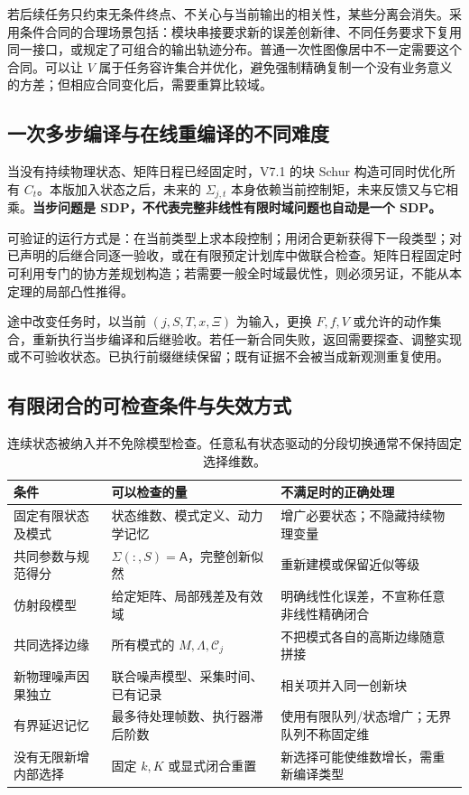 \documentclass[UTF8,fontset=fandol,11pt,a4paper]{ctexart}
\theoremstyle{definition}\newtheorem{definition}[theorem]{定义}\newtheorem{assumption}[theorem]{条件}
\numberwithin{equation}{section}
\begin{document}
若后续任务只约束无条件终点、不关心与当前输出的相关性，某些分离会消失。采用条件合同的合理场景包括：模块串接要求新的误差创新律、不同任务要求下复用同一接口，或规定了可组合的输出轨迹分布。普通一次性图像居中不一定需要这个合同。可以让 $V$ 属于任务容许集合并优化，避免强制精确复制一个没有业务意义的方差；但相应合同变化后，需要重算比较域。

\subsection{一次多步编译与在线重编译的不同难度}
当没有持续物理状态、矩阵日程已经固定时，V7.1 的块 Schur 构造可同时优化所有 $C_t$。本版加入状态之后，未来的 $\Sigma_{j,t}$ 本身依赖当前控制矩，未来反馈又与它相乘。\textbf{当步问题是 SDP，不代表完整非线性有限时域问题也自动是一个 SDP。}

可验证的运行方式是：在当前类型上求本段控制；用闭合更新获得下一段类型；对已声明的后继合同逐一验收，或在有限预定计划库中做联合检查。矩阵日程固定时可利用专门的协方差规划构造；若需要一般全时域最优性，则必须另证，不能从本定理的局部凸性推得。

途中改变任务时，以当前 $(j,S,T,x,\Xi)$ 为输入，更换 $F,f,V$ 或允许的动作集合，重新执行当步编译和后继验收。若任一新合同失败，返回需要探查、调整实现或不可验收状态。已执行前缀继续保留；既有证据不会被当成新观测重复使用。

\subsection{有限闭合的可检查条件与失效方式}
\begin{table}[ht]\centering\small
\begin{tabularx}{\linewidth}{p{.25\linewidth}YY}
\toprule
条件 & 可以检查的量 & 不满足时的正确处理\\\midrule
固定有限状态及模式 & 状态维数、模式定义、动力学记忆 & 增广必要状态；不隐藏持续物理变量\\
共同参数与规范得分 & $\Sigma(:,S)=\mathsf A$，完整创新似然 & 重新建模或保留近似等级\\
仿射段模型 & 给定矩阵、局部残差及有效域 & 明确线性化误差，不宣称任意非线性精确闭合\\
共同选择边缘 & 所有模式的 $M,\Lambda,\mathcal C_j$ & 不把模式各自的高斯边缘随意拼接\\
新物理噪声因果独立 & 联合噪声模型、采集时间、已有记录 & 相关项并入同一创新块\\
有界延迟记忆 & 最多待处理帧数、执行器滞后阶数 & 使用有限队列/状态增广；无界队列不称固定维\\
没有无限新增内部选择 & 固定 $k,K$ 或显式闭合重置 & 新选择可能使维数增长，需重新编译类型\\
\bottomrule
\end{tabularx}
\caption{连续状态被纳入并不免除模型检查。任意私有状态驱动的分段切换通常不保持固定选择维数。}
\end{table}
\end{document}
